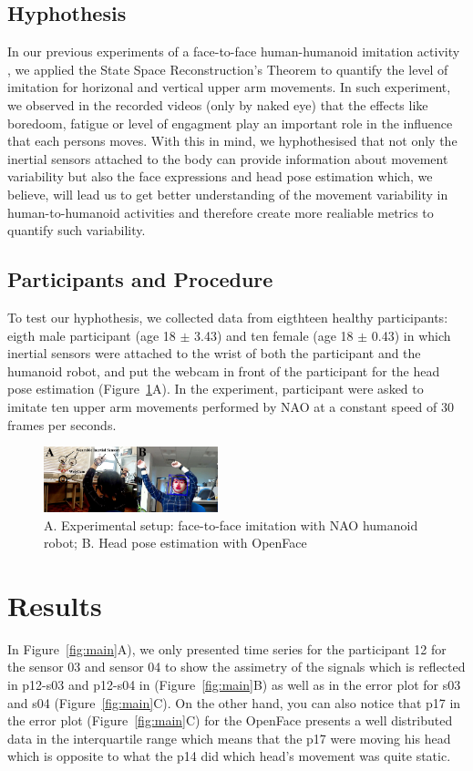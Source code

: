 \documentclass{sigchi}
\begin{document}
\subsection{Hyphothesis}
In our previous experiments of a face-to-face human-humanoid imitation
activity \cite{XXX2017}, we applied the State Space Reconstruction's Theorem
to quantify the level of imitation for horizonal and vertical upper arm movements.
In such experiment, we observed in the recorded videos (only by naked eye)
that the effects like boredoom, fatigue or level of engagment play an important
role in the influence that each persons moves.
With this in mind, we hyphothesised that not only the inertial sensors attached
to the body can provide information about movement variability but also the
face expressions and head pose estimation which, we believe, will lead us
to get better understanding of the movement variability in human-to-humanoid
activities and therefore create more realiable metrics to quantify such variability.


\subsection{Participants and Procedure}
To test our hyphothesis, we collected data from eigthteen healthy participants:
eigth male participant (age 18 $\pm$ 3.43) and ten female (age 18 $\pm$ 0.43)
in which inertial sensors were attached to the wrist of both the participant and the
humanoid robot, and put the webcam in front of the participant for the head pose
estimation (Figure~\ref{fig:exp}A).
In the experiment, participant were asked to imitate ten upper arm movements
performed by NAO  at a constant speed of 30 frames per seconds.
\begin{figure}[!htb]
\centering
\includegraphics[width=0.45\textwidth]{figures/experiment/fig_w619h233}
\caption[PA]{A. Experimental setup: face-to-face imitation with NAO humanoid robot;
B. Head pose estimation with OpenFace \cite{Baltrusaitis2016} }
\label{fig:exp}
\end{figure}


\section{Results}
In Figure~\ref{fig:main}A), we only presented time series for the participant 12
for the sensor 03 and sensor 04 to show the assimetry of the signals which is
reflected in p12-s03 and p12-s04 in (Figure~\ref{fig:main}B) as well as in the
error plot for s03 and s04 (Figure~\ref{fig:main}C). On the other hand,
you can also notice that p17 in the error plot (Figure~\ref{fig:main}C)
for the OpenFace presents a well distributed data in the interquartile range
which means that the p17 were moving his head which is opposite to what
the p14 did which head's movement was quite static.
\end{document}
